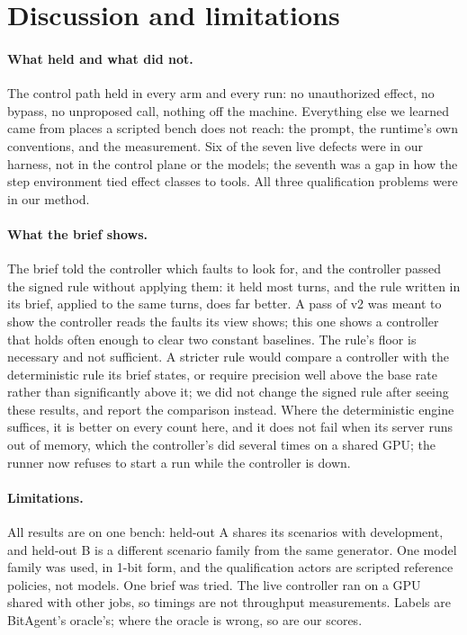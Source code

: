 \documentclass[11pt]{article}
\begin{document}
\section{Discussion and limitations}

\paragraph{What held and what did not.} The control path held in every arm and every run: no unauthorized effect, no bypass, no unproposed call, nothing off the machine. Everything else we learned came from places a scripted bench does not reach: the prompt, the runtime's own conventions, and the measurement. Six of the seven live defects were in our harness, not in the control plane or the models; the seventh was a gap in how the step environment tied effect classes to tools. All three qualification problems were in our method.

\paragraph{What the brief shows.} The brief told the controller which faults to look for, and the controller passed the signed rule without applying them: it held most turns, and the rule written in its brief, applied to the same turns, does far better. A pass of v2 was meant to show the controller reads the faults its view shows; this one shows a controller that holds often enough to clear two constant baselines. The rule's floor is necessary and not sufficient. A stricter rule would compare a controller with the deterministic rule its brief states, or require precision well above the base rate rather than significantly above it; we did not change the signed rule after seeing these results, and report the comparison instead. Where the deterministic engine suffices, it is better on every count here, and it does not fail when its server runs out of memory, which the controller's did several times on a shared GPU; the runner now refuses to start a run while the controller is down.

\paragraph{Limitations.} All results are on one bench: held-out A shares its scenarios with development, and held-out B is a different scenario family from the same generator. One model family was used, in 1-bit form, and the qualification actors are scripted reference policies, not models. One brief was tried. The live controller ran on a GPU shared with other jobs, so timings are not throughput measurements. Labels are BitAgent's oracle's; where the oracle is wrong, so are our scores.
\end{document}

